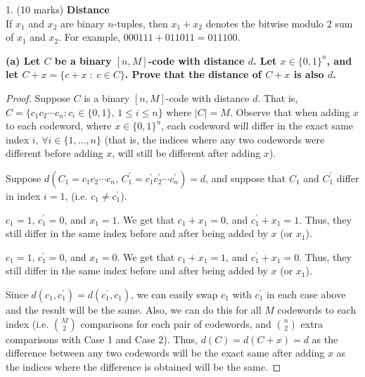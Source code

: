 


1. (10 marks) \textbf{Distance}\\
If $x_1$ and $x_2$ are binary $n$-tuples, then $x_1+x_2$ denotes the
bitwise modulo 2 sum of $x_1$ and $x_2$.
For example, $000111 + 011011 = 011100$.

\textbf{(a) Let $C$ be a binary $[n,M]$-code with distance $d$. Let $x \in \{0,1\}^n$,
and let $C+x = \{c+x\; : \; c \in C\}$. Prove that the distance of $C+x$ is
also $d$.}

\begin{proof}
    Suppose $ C $ is a binary $ [n,M] $-code with distance $ d $. That is,
    $ C=\{c_1c_2\cdots c_n:c_i\in \{0,1\},\, 1\le i \le n\} $
    where $ |C|=M $. Observe that when adding $ x $ to each codeword,
    where $ x\in \{0,1\}^n $, each codeword will differ in the exact same
    index $ i,\,\forall i\in \{1,\ldots ,n\} $ (that is, the indices 
    where any two codewords were different before adding $ x $,
    will still be different after adding $ x $).

    Suppose $ d(C_1=c_1c_2\cdots c_n,\,C_1^\prime=c_1^\prime c_2^\prime\cdots c_n^\prime)=d $,
    and suppose that $ C_1 $ and $ C_1^\prime $ differ in index $ i=1 $, (i.e.
    $ c_1\neq c_1^\prime $).


    $ c_1=1,\,c_1^\prime=0 $, and $ x_1=1 $. We get that $ c_1+x_1=0 $, and
    $ c_1^\prime+x_1=1 $. Thus, they still differ in the same index before
    and after being added by $ x $ (or $ x_1 $).


    $ c_1=1,\,c_1^\prime=0 $, and $ x_1=0 $. We get that $ c_1+x_1=1 $, and
    $ c_1^\prime+x_1=0 $. Thus, they still differ in the same index before
    and after being added by $ x $ (or $ x_1 $).

    Since $ d(c_1,c_1^\prime)=d(c_1^\prime,c_1) $, we can easily swap
    $ c_1 $ with $ c_1^\prime $ in each case above and the result will be the same.
    Also, we can do this for all $ M $ codewords to each index 
    (i.e. $ \binom{M}{2} $ comparisons for each pair of codewords,
    and $ \binom{n}{2} $ extra comparisons with Case 1 and Case 2).
    Thus, $ d(C)=d(C+x)=d $ as the difference between any two codewords
    will be the exact same after adding $ x $ as the indices where
    the difference is obtained will be the same.
\end{proof}


